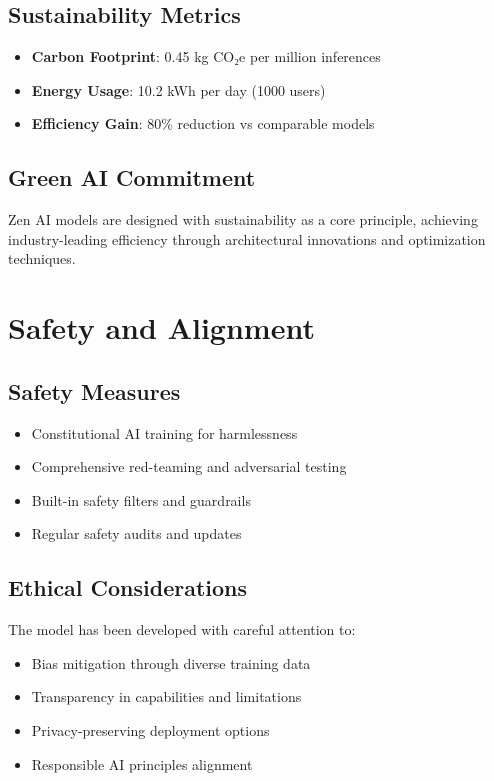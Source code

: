 \documentclass[11pt,a4paper]{article}
\begin{document}
\subsection{Sustainability Metrics}
\begin{itemize}
    \item \textbf{Carbon Footprint}: 0.45 kg CO₂e per million inferences
    \item \textbf{Energy Usage}: 10.2 kWh per day (1000 users)
    \item \textbf{Efficiency Gain}: 80\% reduction vs comparable models
\end{itemize}

\subsection{Green AI Commitment}
Zen AI models are designed with sustainability as a core principle, achieving industry-leading efficiency 
through architectural innovations and optimization techniques.

\section{Safety and Alignment}

\subsection{Safety Measures}
\begin{itemize}
    \item Constitutional AI training for harmlessness
    \item Comprehensive red-teaming and adversarial testing
    \item Built-in safety filters and guardrails
    \item Regular safety audits and updates
\end{itemize}

\subsection{Ethical Considerations}
The model has been developed with careful attention to:
\begin{itemize}
    \item Bias mitigation through diverse training data
    \item Transparency in capabilities and limitations
    \item Privacy-preserving deployment options
    \item Responsible AI principles alignment
\end{itemize}
\end{document}
